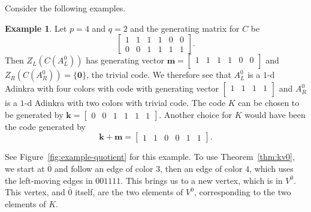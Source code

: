 \documentclass[12pt,twoside,singlespace]{article}
\numberwithin{equation}{section}
\theoremstyle{definition}
\newtheorem{ex}[equation]{Example}
\renewcommand{\vec}[1]{\mathbf{#1}}
\begin{document}
Consider the following examples.
\begin{ex}
Let $p=4$ and $q=2$ and the generating matrix for $C$ be
\[\left[\begin{array}{cccc|cc}
1&1&1&1&0&0\\
0&0&1&1&1&1
\end{array}\right].\]
Then $Z_L(C(A_L^0))$ has generating vector $\vec{m} = \left[\begin{array}{cccc|cc}
1&1&1&1&0&0\\
\end{array}\right]$ and $Z_R(C(A_R^0))=\{\vec{0}\}$, the trivial code.  We therefore see that $A_L^0$ is a $1$-d Adinkra with four colors with code with generating vector
$\left[\begin{array}{cccc}
1&1&1&1\\
\end{array}\right]$ and $A_R^0$ is a $1$-d Adinkra with two colors with trivial code.  The code $K$ can be chosen to be generated by $\vec{k} = \left[\begin{array}{cccc|cc}
0&0&1&1&1&1
\end{array}\right]$. Another choice for $K$ would have been the code generated by 
\[\vec{k} + \vec{m} = \left[\begin{array}{cccc|cc}
1&1&0&0&1&1
\end{array}\right].\]

See Figure~\ref{fig:example-quotient} for this example. To use Theorem~\ref{thm:kv0}, we start at $\overline{0}$ and follow an edge of color $3$, then an edge of color $4$, which uses the left-moving edges in $001111$.  This brings us to a new vertex, which is in $V^0$.  This vertex, and $\overline{0}$ itself, are the two elements of $V^0$, corresponding to the two elements of $K$. 
\end{ex}
\end{document}
